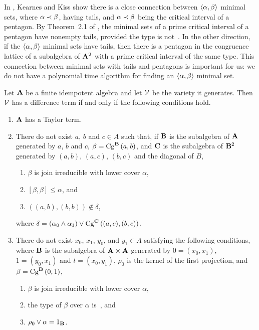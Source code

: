In \cite{KearnesKiss1999}, Kearnes and Kiss show there is a close connection
between $\la \alpha,\beta\ra$ minimal sets, where $\alpha \cov \beta$, 
having tails, and  $\alpha \cov \beta$ being the critical interval of
a pentagon. By Theorem~2.1 of \cite{KearnesKiss1999}, the minimal sets
of a prime critical interval of a pentagon have nonempty tails, provided
the type is not~\utyp. In the other direction, if the 
$\la \alpha,\beta\ra$ minimal sets have tails, then there is a pentagon in
the congruence lattice of a subalgebra of $\alg A^2$ with a prime critical 
interval of the same type. This connection between minimal sets with tails and
pentagons is important for us: we do not have a polynomial time algorithm
for finding an $\la \alpha,\beta\ra$ minimal set.



\begin{theorem}
Let $\alg A$ be a finite idempotent algebra and let $\sV$ be the variety 
it generates. Then $\sV$ has a difference term if and only if the
following conditions hold.
\begin{enumerate}
\item $\alg A$ has a Taylor term.
\item There do not exist $a$, $b$ and $c\in A$
such that, if\/ $\alg B$ is the subalgebra of $\alg A$ generated
by $a$, $b$ and $c$,  $\beta = \Cga a b B$, and
$\alg C$ is the subalgebra of $\alg B^2$ generated by 
$(a,b)$, $(a,c)$, $(b,c)$ and the diagonal of $B$,
\begin{enumerate}
\item $\beta$ is join irreducible with lower cover $\alpha$,
\item $[\beta,\beta] \le \alpha$, and
\item $((a,b),(b,b)) \notin \delta$,
\end{enumerate}
where $\delta = (\alpha_0 \meet \alpha_1) \join \Cga {(a,c)} {(b,c)} C$.
\item There do not exist $x_0$, $x_1$, $y_0$, and $y_1\in A$ satisfying
the following conditions, where 
$\alg B$ is the subalgebra of 
$\alg A \times \alg A$ generated by $0 = (x_0, x_1)$, $1 = (y_0,x_1)$ 
and $t = (x_0,y_1)$, $\rho_0$ is the kernel of the first projection,
and $\beta = \Cga01{B}$,
\begin{enumerate}
\item $\beta$ is join irreducible with lower cover $\alpha$,
\item the type of $\beta$ over  $\alpha$ is~\atyp, and
\item 
$\rho_0 \join \alpha = 1_{\alg B}$.
\end{enumerate}
\end{enumerate}
\end{theorem}

